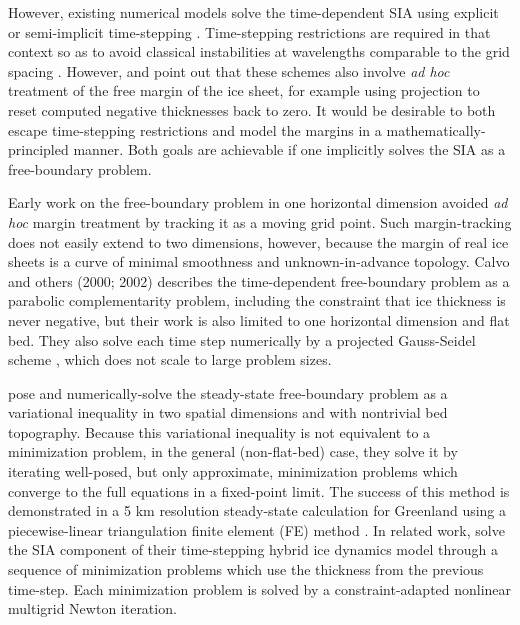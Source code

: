 \documentclass[twocolumn,letterpaper]{igs}
\begin{document}
However, existing numerical models solve the time-dependent SIA using explicit or semi-implicit time-stepping  \citep{HindmarshPayne1996,Huybrechtsetal1996,Bueleretal2005,EgholmNielsen2010,JaroschSchoofAnslow2013}.  Time-stepping restrictions are required in that context so as to avoid classical instabilities at wavelengths comparable to the grid spacing \citep{MortonMayers2005}.  However, \cite{Bueleretal2005} and \cite{JaroschSchoofAnslow2013} point out that these schemes also involve \emph{ad hoc} treatment of the free margin of the ice sheet, for example using projection to reset computed negative thicknesses back to zero.  It would be desirable to both escape time-stepping restrictions and model the margins in a mathematically-principled manner.  Both goals are achievable if one implicitly solves the SIA as a free-boundary problem.

Early work on the free-boundary problem in one horizontal dimension \citep{Hindmarshetal1987} avoided \emph{ad hoc} margin treatment by tracking it as a moving grid point.  Such margin-tracking does not easily extend to two dimensions, however, because the margin of real ice sheets is a curve of minimal smoothness and unknown-in-advance topology.  Calvo and others (2000; 2002) \nocite{CalvoDuranyVazquez2000,Calvoetal2002} describes the time-dependent free-boundary problem as a parabolic complementarity problem, including the constraint that ice thickness is never negative, but their work is also limited to one horizontal dimension and flat bed.  They also solve each time step numerically by a projected Gauss-Seidel scheme \citep{Ciarlet2002}, which does not scale to large problem sizes.

\cite{JouvetBueler2012} pose and numerically-solve the steady-state free-boundary problem as a variational inequality \citep{KinderlehrerStampacchia1980} in two spatial dimensions and with nontrivial bed topography.  Because this variational inequality is not equivalent to a minimization problem, in the general (non-flat-bed) case, they solve it by iterating well-posed, but only approximate, minimization problems which converge to the full equations in a fixed-point limit.  The success of this method is demonstrated in a 5 km resolution steady-state calculation for Greenland using a piecewise-linear triangulation finite element (FE) method \citep{Elmanetal2005}.  In related work, \cite{JouvetGraeser2013} solve the SIA component of their time-stepping hybrid \citep{Winkelmannetal2011} ice dynamics model through a sequence of minimization problems which use the thickness from the previous time-step.  Each minimization problem is solved by a constraint-adapted nonlinear multigrid Newton iteration.
\end{document}
